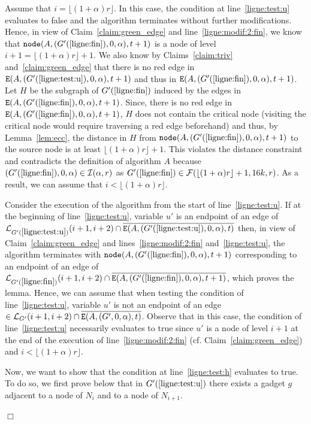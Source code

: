 \documentclass[11pt]{article}
\newcommand{\qed}{\hfill $\Box$ \bigbreak}
\newenvironment{proof}{\noindent {\bf Proof.}}{\qed}
\begin{document}
{\begin{proof}
Assume that $i=\lfloor(1+\alpha)r\rfloor$. In this case, the condition at line~\ref{ligne:test:u} evaluates to false and the algorithm terminates without further modifications. Hence, in view of Claim~\ref{claim:green_edge} and line~\ref{ligne:modif:2:fin}, we know that ${\tt node}(A,(G'({\ref{ligne:fin}}),0,\alpha),t+1)$ is a node of level $i+1=\lfloor(1+\alpha)r\rfloor+1$. We also know by Claims~\ref{claim:triv} and~\ref{claim:green_edge} that there is no red edge in ${\tt E}(A,(G'(\ref{ligne:test:u}),0,\alpha),t+1)$ and thus in ${\tt E}(A,(G'(\ref{ligne:fin}),0,\alpha),t+1)$. Let $H$ be the subgraph of $G'({\ref{ligne:fin}})$ induced by the edges in ${\tt E}(A,(G'({\ref{ligne:fin}}),0,\alpha),t+1)$. Since, there is no red edge in ${\tt E}(A,(G'(\ref{ligne:fin}),0,\alpha),t+1)$, $H$ does not contain the critical node (visiting the critical node would require traversing a red edge beforehand) and thus, by Lemma~\ref{lem:ecc}, the distance in $H$ from ${\tt node}(A,(G'({\ref{ligne:fin}}),0,\alpha),t+1)$ to the source node is at least $\lfloor(1+\alpha)r\rfloor+1$. This violates the distance constraint and contradicts the definition of algorithm $A$ because $(G'(\ref{ligne:fin}),0,\alpha)\in\mathcal{I}(\alpha,r)$ as $G'(\ref{ligne:fin})\in\mathcal{F}(\lfloor(1+\alpha)r\rfloor+1,16k,r)$. As a result, we can assume that $i<\lfloor(1+\alpha)r\rfloor$.

Consider the execution of the algorithm from the start of line~\ref{ligne:test:u}. If at the beginning of line~\ref{ligne:test:u}, variable $u'$ is an endpoint of an edge of $\mathcal{L}_{G'({\ref{ligne:test:u}})}(i+1,i+2)\cap\overline{{\tt E}(A,(G'({\ref{ligne:test:u}}),0,\alpha),t)}$ then, in view of Claim~\ref{claim:green_edge} and lines~\ref{ligne:modif:2:fin} and~\ref{ligne:test:u}, the algorithm terminates with ${\tt node}(A,(G'(\ref{ligne:fin}),0,\alpha),t+1)$ corresponding to an endpoint of an edge of $\mathcal{L}_{G'(\ref{ligne:fin})}(i+1,i+2)\cap\overline{{\tt E}(A,(G'(\ref{ligne:fin}),0,\alpha),t+1)}$, which proves the lemma. Hence, we can assume that when testing the condition  of line~\ref{ligne:test:u}, variable $u'$ is not an endpoint of an edge $\in\mathcal{L}_{G'}(i+1,i+2)\cap\overline{{\tt E}(A,(G',0,\alpha),t)}$. Observe that in this case, the condition of line~\ref{ligne:test:u} necessarily evaluates to true since $u'$ is a node of level $i+1$ at the end of the execution of line~\ref{ligne:modif:2:fin} (cf. Claim~\ref{claim:green_edge}) and $i<\lfloor(1+\alpha)r\rfloor$.

Now, we want to show that the condition at line~\ref{ligne:test:h} evaluates to true. To do so, we first prove below that in $G'(\ref{ligne:test:u})$ there exists a gadget $g$ adjacent to a node of $N_i$ and to a node of $N_{i+1}$. 


\end{proof}}
\end{document}
